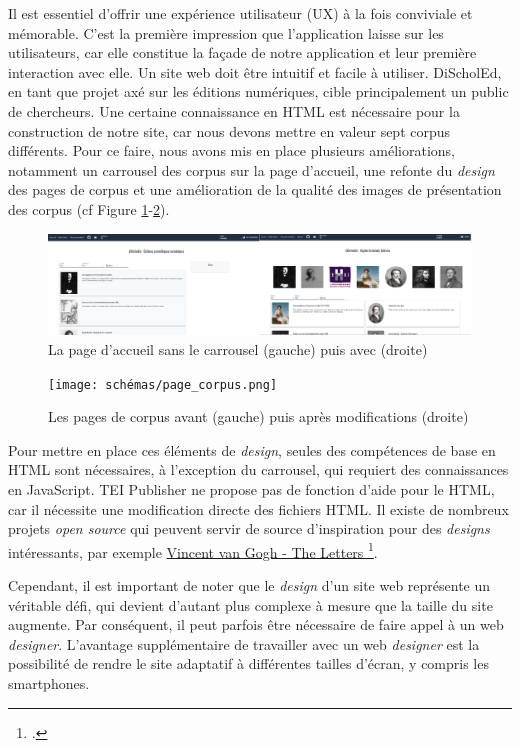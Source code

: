 Il est essentiel d'offrir une expérience utilisateur (UX) à la fois conviviale et mémorable. C'est la première impression que l'application laisse sur les utilisateurs, car elle constitue la façade de notre application et leur première interaction avec elle. Un site web doit être intuitif et facile à utiliser. DiScholEd, en tant que projet axé sur les éditions numériques, cible principalement un public de chercheurs. Une certaine connaissance en HTML est nécessaire pour la construction de notre site, car nous devons mettre en valeur sept corpus différents. Pour ce faire, nous avons mis en place plusieurs améliorations, notamment un carrousel des corpus sur la page d'accueil, une refonte du \textit{design} des pages de corpus et une amélioration de la qualité des images de présentation des corpus (cf Figure \ref{fig:schémas11}-\ref{fig:schémas13}).

\begin{figure}[H]
\centering
\includegraphics[width=1\linewidth]{schémas/carrousel.png}
\caption{ La page d’accueil sans le carrousel (gauche) puis avec (droite) }
\label{fig:schémas11}
\end{figure}

\begin{figure}[H]
\centering
\texttt{[image: schémas/page\_corpus.png]}
\caption{Les pages de corpus avant (gauche) puis après modifications (droite)}
\label{fig:schémas13}
\end{figure}

Pour mettre en place ces éléments de \textit{design}, seules des compétences de base en HTML sont nécessaires, à l'exception du carrousel, qui requiert des connaissances en JavaScript. TEI Publisher ne propose pas de fonction d'aide pour le HTML, car il nécessite une modification directe des fichiers HTML. Il existe de nombreux projets \textit{open source} qui peuvent servir de source d'inspiration pour des \textit{designs} intéressants, par exemple \href{https://teipublisher.com/exist/apps/vangogh/index.html}{Vincent van Gogh - The Letters
\footcite{VanGoghLetters}}. 

Cependant, il est important de noter que le \textit{design} d'un site web représente un véritable défi, qui devient d'autant plus complexe à mesure que la taille du site augmente. Par conséquent, il peut parfois être nécessaire de faire appel à un web \textit{designer}. L'avantage supplémentaire de travailler avec un web \textit{designer} est la possibilité de rendre le site adaptatif à différentes tailles d'écran, y compris les smartphones.

